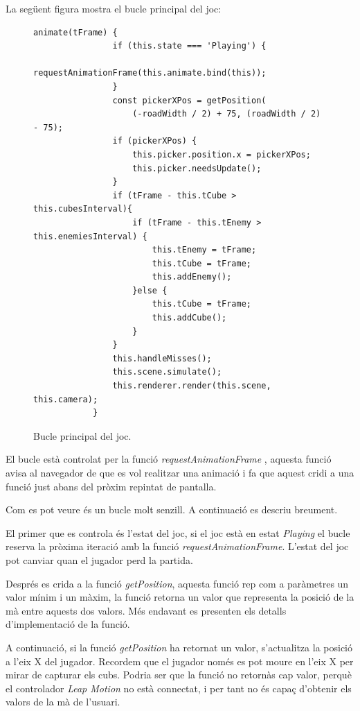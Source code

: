\documentclass[12pt,a4paper,catalan]{article}
\begin{document}
	La següent figura mostra el bucle principal del joc:
	\begin{figure}[H]
		\begin{lstlisting}[gobble=12, tabsize=4]
			animate(tFrame) {
				if (this.state === 'Playing') {
					requestAnimationFrame(this.animate.bind(this));
				}
				const pickerXPos = getPosition(
					(-roadWidth / 2) + 75, (roadWidth / 2) - 75);
				if (pickerXPos) {
					this.picker.position.x = pickerXPos;
					this.picker.needsUpdate();
				}
				if (tFrame - this.tCube > this.cubesInterval){
					if (tFrame - this.tEnemy > this.enemiesInterval) {
						this.tEnemy = tFrame;
						this.tCube = tFrame;
						this.addEnemy();
					}else {
						this.tCube = tFrame;
						this.addCube();
					}
				}
				this.handleMisses();
				this.scene.simulate();
				this.renderer.render(this.scene, this.camera);
			}
		\end{lstlisting}
		\caption{Bucle principal del joc.}
		\label{fig:cubes-road-animate}
	\end{figure}
	El bucle està controlat per la funció \textit{requestAnimationFrame} \cite{request-animation-frame}, aquesta funció avisa al navegador de que es vol realitzar una animació i fa que aquest cridi a una funció just abans del pròxim repintat de pantalla.
	
	Com es pot veure és un bucle molt senzill. A continuació es descriu breument.
	
	El primer que es controla és l'estat del joc, si el joc està en estat \textit{Playing} el bucle reserva la pròxima iteració amb la funció \textit{requestAnimationFrame}. L'estat del joc pot canviar quan el jugador perd la partida.
	
	Després es crida a la funció \textit{getPosition}, aquesta funció rep com a paràmetres un valor mínim i un màxim, la funció retorna un valor que representa la posició de la mà entre aquests dos valors. Més endavant es presenten els detalls d'implementació de la funció.
	
	A continuació, si la funció \textit{getPosition} ha retornat un valor, s'actualitza la posició a l'eix X del jugador. Recordem que el jugador només es pot moure en l'eix X per mirar de capturar els cubs. Podria ser que la funció no retornàs cap valor, perquè el controlador \textit{Leap Motion} no està connectat, i per tant no és capaç d'obtenir els valors de la mà de l'usuari.
	
\end{document}
